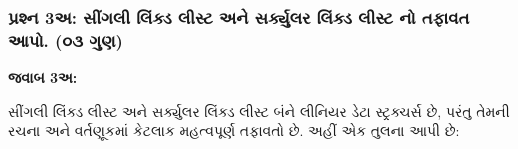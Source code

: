 \hypertarget{uxaaauxab0uxab6uxaa8-3uxa85-uxab8uxa97uxab2-uxab2uxa95uxaa1-uxab2uxab8uxa9f-uxa85uxaa8-uxab8uxab0uxa95uxaafuxab2uxab0-uxab2uxa95uxaa1-uxab2uxab8uxa9f-uxaa8-uxaa4uxaabuxab5uxaa4-uxa86uxaaa.-uxae6uxae9-uxa97uxaa3}{%
\subsubsection{પ્રશ્ન 3અ: સીંગલી લિંક્ડ લીસ્ટ અને સર્ક્યુલર લિંક્ડ લીસ્ટ નો તફાવત
આપો. (૦૩
ગુણ)}\label{uxaaauxab0uxab6uxaa8-3uxa85-uxab8uxa97uxab2-uxab2uxa95uxaa1-uxab2uxab8uxa9f-uxa85uxaa8-uxab8uxab0uxa95uxaafuxab2uxab0-uxab2uxa95uxaa1-uxab2uxab8uxa9f-uxaa8-uxaa4uxaabuxab5uxaa4-uxa86uxaaa.-uxae6uxae9-uxa97uxaa3}}

\textbf{જવાબ 3અ:}

સીંગલી લિંક્ડ લીસ્ટ અને સર્ક્યુલર લિંક્ડ લીસ્ટ બંને લીનિયર ડેટા સ્ટ્રક્ચર્સ છે, પરંતુ તેમની
રચના અને વર્તણૂકમાં કેટલાક મહત્વપૂર્ણ તફાવતો છે. અહીં એક તુલના આપી છે:

